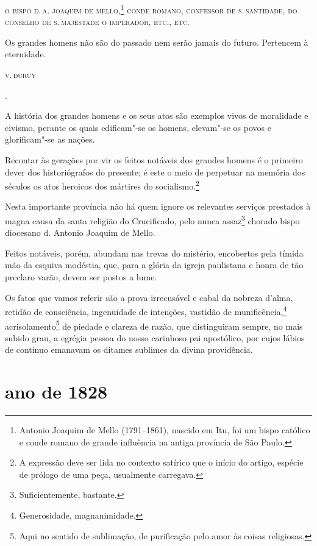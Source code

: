 \textsc{o bispo d.\,a. joaquim de mello},\footnote{Antonio Joaquim de Mello
  (1791--1861), nascido em Itu, foi um bispo católico e conde romano de
  grande influência na antiga província de São Paulo.} \textsc{conde romano,
  confessor de s.\,santidade, do conselho de s.\,majestade o imperador,
  etc., etc.}

\epigraph{Os grandes homens não são do passado
nem serão jamais do futuro. Pertencem à eternidade.}{\textsc{v.\,duruy}\footnotemark}.

A história dos grandes homens e os seus atos são exemplos vivos de
moralidade e civismo, perante os quais edificam"-se os homens, elevam"-se
os povos e glorificam"-se as nações.

Recontar às gerações por vir os feitos notáveis dos grandes homens é o
primeiro dever dos historiógrafos do presente; é este o meio de
perpetuar na memória dos séculos os atos heroicos dos mártires do
socialismo.\footnote{A expressão deve ser lida no contexto satírico
  que o início do artigo, espécie de prólogo de uma peça, usualmente
  carregava.}

Nesta importante província não há quem ignore os relevantes serviços
prestados à magna causa da santa religião do Crucificado, pelo nunca
assaz\footnote{Suficientemente, bastante.} chorado bispo diocesano d.
Antonio Joaquim de Mello.

Feitos notáveis, porém, abundam nas trevas do mistério, encobertos pela
tímida mão da esquiva modéstia, que, para a glória da igreja paulistana
e honra de tão preclaro varão, devem ser postos a lume.

Os fatos que vamos referir são a prova irrecusável e cabal da nobreza
d'alma, retidão de consciência, ingenuidade de intenções, vastidão de
munificência,\footnote{Generosidade, magnanimidade.}
acrisolamento\footnote{Aqui no sentido de sublimação, de purificação
  pelo amor às coisas religiosas.} de piedade e clareza de razão, que
distinguiram sempre, no mais subido grau, a egrégia pessoa do nosso
carinhoso pai apostólico, por cujos lábios de contínuo emanavam os
ditames sublimes da divina providência.

\section*{ano de 1828}

